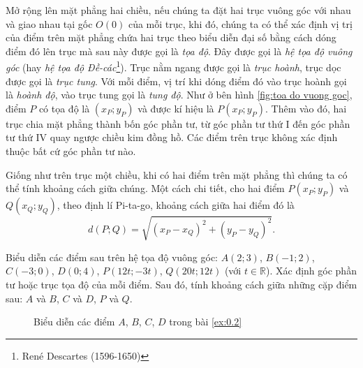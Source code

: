 \documentclass[a4paper, titlepage, openany]{book}
\newcounter{exercise}
\newcounter{solution}
\begin{document}
Mở rộng lên mặt phẳng hai chiều, nếu chúng ta đặt hai trục vuông góc với nhau và giao nhau tại gốc $O(0)$ của mỗi trục, khi đó, chúng ta có thể xác định vị trị của điểm trên mặt phẳng chứa hai trục theo biểu diễn đại số bằng cách dóng điểm đó lên trục mà sau này được gọi là \emph{tọa độ}. Đây được gọi là \emph{hệ tọa độ vuông góc} (hay \emph{hệ tọa độ Đề-các}\footnote{René Descartes (1596-1650)}). Trục nằm ngang được gọi là \emph{trục hoành}, trục dọc được gọi là \emph{trục tung}. Với mỗi điểm, vị trí khi dóng điểm đó vào trục hoành gọi là \emph{hoành độ}, vào trục tung gọi là \emph{tung độ}. Như ở bên hình \ref{fig:toa do vuong goc}, điểm $P$ có tọa độ là $(x_P;y_P)$ và được kí hiệu là $P(x_P;y_P)$. Thêm vào đó, hai trục chia mặt phẳng thành bốn góc phần tư, từ góc phần tư thứ I đến góc phần tư thứ IV quay ngược chiều kim đồng hồ. Các điểm trên trục không xác định thuộc bất cứ góc phần tư nào.

Giống như trên trục một chiều, khi có hai điểm trên mặt phẳng thì chúng ta có thể tính khoảng cách giữa chúng. Một cách chi tiết, cho hai điểm $P(x_P;y_P)$ và $Q(x_Q;y_Q)$, theo định lí Pi-ta-go, khoảng cách giữa hai điểm đó là $$d(P;Q)=\sqrt{(x_P-x_Q)^2+(y_P-y_Q)^2}.$$

\exercise[ex:0.2] Biểu diễn các điểm sau trên hệ tọa độ vuông góc: $A(2;3)$, $B(-1;2)$, $C(-3;0)$, $D(0;4)$, $P(12t;-3t)$, $Q(20t;12t)$ (với $t \in \mathbb{R}$). Xác định góc phần tư hoặc trục tọa độ của mỗi điểm. Sau đó, tính khoảng cách giữa những cặp điểm sau: $A$ và $B$, $C$ và $D$, $P$ và $Q$.

\solution[ex:0.2]

\begin{figure}[h]
   \centering
   \caption{Biểu diễn các điểm $A$, $B$, $C$, $D$ trong bài \ref{ex:0.2}}
   \label{fig:toa do vuong goc bai tap}
\end{figure}
\end{document}

